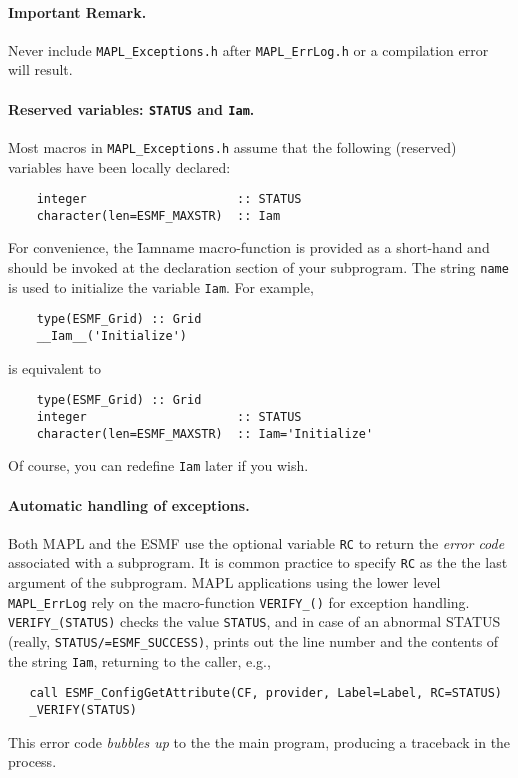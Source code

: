 \paragraph{Important Remark.} Never include {\tt MAPL\_Exceptions.h}
after {\tt MAPL\_ErrLog.h} or a compilation error will result. 

\paragraph{Reserved variables: {\tt STATUS} and {\tt Iam}.} Most
macros in {\tt MAPL\_Exceptions.h} assume that the following
(reserved) variables have been locally declared:
\begin{verbatim}
    integer                     :: STATUS
    character(len=ESMF_MAXSTR)  :: Iam
\end{verbatim}
For convenience, the \f{Iam}{name} macro-function is provided as a
short-hand and should be invoked at the declaration section of your
subprogram. The string {\tt name} is used to initialize the variable
{\tt Iam}. For example,
\begin{verbatim}
    type(ESMF_Grid) :: Grid
    __Iam__('Initialize')
\end{verbatim}
is equivalent to
\begin{verbatim}
    type(ESMF_Grid) :: Grid
    integer                     :: STATUS
    character(len=ESMF_MAXSTR)  :: Iam='Initialize'
\end{verbatim}
Of course, you can redefine {\tt Iam} later if you wish.

\paragraph{Automatic handling of exceptions.}

Both MAPL and the ESMF use the optional variable {\tt RC} to return
the {\em error code} associated with a subprogram. It is common
practice to specify {\tt RC} as the the last argument of the subprogram. MAPL
applications using the lower level {\tt MAPL\_ErrLog} rely on the
macro-function {\tt VERIFY\_()} for exception handling. {\tt
  VERIFY\_(STATUS)} checks the value {\tt STATUS}, and in case of an
abnormal STATUS (really, {\tt STATUS/=ESMF\_SUCCESS)}, prints out the line
number and the contents of the string {\tt Iam}, returning to the caller, e.g.,
\begin{verbatim}
   call ESMF_ConfigGetAttribute(CF, provider, Label=Label, RC=STATUS)
   _VERIFY(STATUS)
\end{verbatim}
This error code {\em bubbles up} to the the main program, producing a
traceback in the process.

